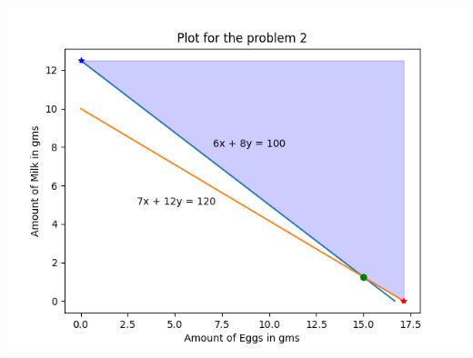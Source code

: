 \documentclass[12pt, letterpaper, twoside]{book}
\begin{document}
\begin{center}
\includegraphics[height=400pt]{Plot2}
\end{center}
\end{document}
